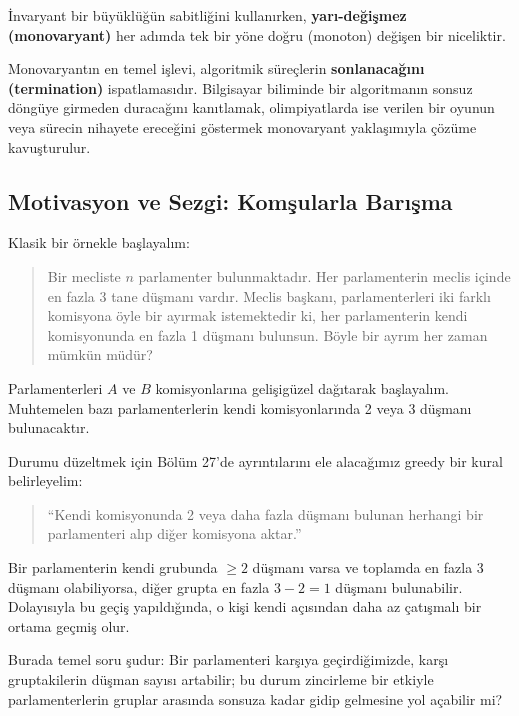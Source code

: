 İnvaryant bir büyüklüğün sabitliğini kullanırken, \textbf{yarı-değişmez (monovaryant)} her adımda tek bir yöne doğru (monoton) değişen bir niceliktir. 

Monovaryantın en temel işlevi, algoritmik süreçlerin \textbf{sonlanacağını (termination)} ispatlamasıdır. Bilgisayar biliminde bir algoritmanın sonsuz döngüye girmeden duracağını kanıtlamak, olimpiyatlarda ise verilen bir oyunun veya sürecin nihayete ereceğini göstermek monovaryant yaklaşımıyla çözüme kavuşturulur.

\subsection{Motivasyon ve Sezgi: Komşularla Barışma}

Klasik bir örnekle başlayalım:
\begin{quote}
Bir mecliste $n$ parlamenter bulunmaktadır. Her parlamenterin meclis içinde en fazla 3 tane düşmanı vardır. Meclis başkanı, parlamenterleri iki farklı komisyona öyle bir ayırmak istemektedir ki, her parlamenterin kendi komisyonunda en fazla 1 düşmanı bulunsun. Böyle bir ayrım her zaman mümkün müdür?
\end{quote}

Parlamenterleri $A$ ve $B$ komisyonlarına gelişigüzel dağıtarak başlayalım. Muhtemelen bazı parlamenterlerin kendi komisyonlarında 2 veya 3 düşmanı bulunacaktır.

Durumu düzeltmek için Bölüm 27'de ayrıntılarını ele alacağımız greedy bir kural belirleyelim:
\begin{quote}
``Kendi komisyonunda 2 veya daha fazla düşmanı bulunan herhangi bir parlamenteri alıp diğer komisyona aktar.''
\end{quote}

Bir parlamenterin kendi grubunda $\ge 2$ düşmanı varsa ve toplamda en fazla 3 düşmanı olabiliyorsa, diğer grupta en fazla $3 - 2 = 1$ düşmanı bulunabilir. Dolayısıyla bu geçiş yapıldığında, o kişi kendi açısından daha az çatışmalı bir ortama geçmiş olur.

Burada temel soru şudur: Bir parlamenteri karşıya geçirdiğimizde, karşı gruptakilerin düşman sayısı artabilir; bu durum zincirleme bir etkiyle parlamenterlerin gruplar arasında sonsuza kadar gidip gelmesine yol açabilir mi?

